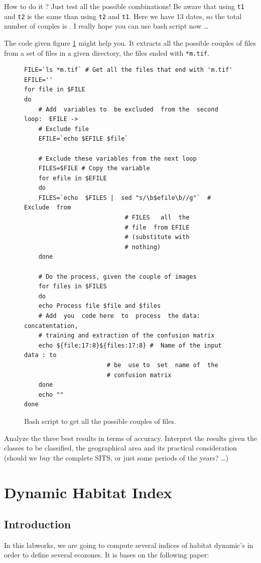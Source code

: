 \documentclass[a4paper,11pt,DIV=18]{scrartcl}
\begin{document}
How to do it ? Just test  all the possible combinations! Be aware that
using \texttt{t1}  and \texttt{t2} is  the same than  using \texttt{t2} and  \texttt{t1}. Here we  have 13
dates, so the  total number of couples is  . I really
hope you can use bash script now \ldots{}

The code given  figure \ref{org5e0a84e} might help you.  It extracts all
the  possible  couples  of files  from  a  set  of  files in  a  given
directory, the files ended with \texttt{*m.tif}.

\begin{figure}
\begin{verbatim}
FILE=`ls *m.tif` # Get all the files that end with 'm.tif'
EFILE=''
for file in $FILE
do
    # Add  variables to  be excluded  from the  second loop:  EFILE ->
    # Exclude file
    EFILE=`echo $EFILE $file`

    # Exclude these variables from the next loop
    FILES=$FILE # Copy the variable
    for efile in $EFILE
    do
	FILES=`echo  $FILES |  sed "s/\b$efile\b//g"`  # Exclude  from
						    # FILES   all  the
						    # file  from EFILE
						    # (substitute with
						    # nothing)
    done

    # Do the process, given the couple of images
    for files in $FILES
    do
	echo Process file $file and $files
	# Add  you  code here  to  process  the data:  concatentation,
	# training and extraction of the confusion matrix
	echo ${file:17:8}${files:17:8} #  Name of the input  data : to
				       # be  use to  set  name of  the
				       # confusion matrix
    done
    echo ""
done
\end{verbatim}
\caption{\label{org5e0a84e}
Bash script to get all the possible couples of files.}
\end{figure}
Analyze the three best results in terms of accuracy. Interpret the
results given the classes to be classified, the geographical area and
its practical consideration (should we buy the complete SITS, or just
some periods of the years? \ldots{})
\section{Dynamic Habitat Index}
\label{sec:org0c4842c}
\subsection{Introduction}
\label{sec:org517f4eb}
In this labworks, we are going to compute several indices of habitat
dynamic's in order to define several ecozones. It is bases on the
following paper: 
\end{document}
